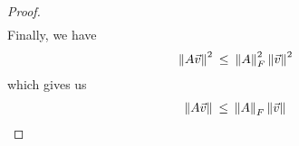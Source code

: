 \begin{proof}
\begin{align*}
    \end{align*}
    Finally, we have
    \begin{align*}
        \left\lVert A\vec{v}\right\rVert^{2} \hspace{2pt} \leq \hspace{2pt} \left\lVert A\right\rVert_{F}^{2} \left\lVert\vec{v}\right\rVert^{2}
    \end{align*}
    which gives us
    \begin{align*}
        \left\lVert A\vec{v}\right\rVert \hspace{2pt} \leq \hspace{2pt} \left\lVert A\right\rVert_{F} \left\lVert\vec{v}\right\rVert
    \end{align*}
\end{proof}

